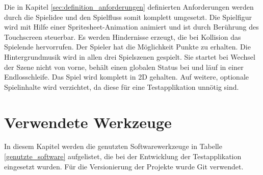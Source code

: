 Die in Kapitel \ref{sec:definition_anforderungen} definierten Anforderungen werden durch die Spielidee und den Spielfluss somit komplett umgesetzt. Die Spielfigur wird mit Hilfe einer Spritesheet-Animation animiert und ist durch Berührung des Touchscreen steuerbar. Es werden Hindernisse erzeugt, die bei Kollision das Spielende hervorrufen. Der Spieler hat die Möglichkeit Punkte zu erhalten.
Die Hintergrundmusik wird in allen drei Spielszenen gespielt. Sie startet bei Wechsel der Szene nicht von vorne, behält einen globalen Status bei und läuf in einer Endlosschleife. Das Spiel wird komplett in 2D gehalten. Auf weitere, optionale Spielinhalte wird verzichtet, da diese für eine Testapplikation unnötig sind.


\section{Verwendete Werkzeuge}
In diesem Kapitel werden die genutzten Softwarewerkzeuge in Tabelle \ref{genutzte_software} aufgelistet, die bei der Entwicklung der Testapplikation eingesetzt wurden. Für die Versionierung der Projekte wurde Git verwendet.


